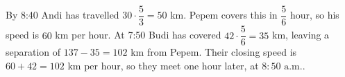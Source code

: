 By 8:40 Andi has travelled $30\cdot\dfrac{5}{3}=50$ km. Pepem covers this in $\dfrac{5}{6}$ hour, so his speed is $60$ km per hour. At 7:50 Budi has covered $42\cdot\dfrac{5}{6}=35$ km, leaving a separation of $137-35=102$ km from Pepem. Their closing speed is $60+42=102$ km per hour, so they meet one hour later, at $\boxed{8{:}50\text{ a.m.}}$.
